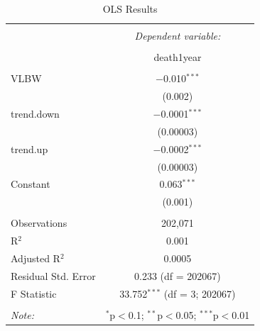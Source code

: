 \documentclass[
]{article}
\begin{document}
\begin{table}[!htbp] \centering 
  \caption{OLS Results} 
  \label{} 
\begin{tabular}{@{\extracolsep{5pt}}lc} 
\\[-1.8ex]\hline 
\hline \\[-1.8ex] 
 & \multicolumn{1}{c}{\textit{Dependent variable:}} \\ 
\cline{2-2} 
\\[-1.8ex] & death1year \\ 
\hline \\[-1.8ex] 
 VLBW & $-$0.010$^{***}$ \\ 
  & (0.002) \\ 
  trend.down & $-$0.0001$^{***}$ \\ 
  & (0.00003) \\ 
  trend.up & $-$0.0002$^{***}$ \\ 
  & (0.00003) \\ 
  Constant & 0.063$^{***}$ \\ 
  & (0.001) \\ 
 \hline \\[-1.8ex] 
Observations & 202,071 \\ 
R$^{2}$ & 0.001 \\ 
Adjusted R$^{2}$ & 0.0005 \\ 
Residual Std. Error & 0.233 (df = 202067) \\ 
F Statistic & 33.752$^{***}$ (df = 3; 202067) \\ 
\hline 
\hline \\[-1.8ex] 
\textit{Note:}  & \multicolumn{1}{r}{$^{*}$p$<$0.1; $^{**}$p$<$0.05; $^{***}$p$<$0.01} \\ 
\end{tabular} 
\end{table}
\end{document}
